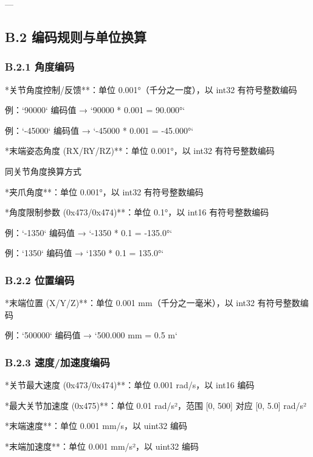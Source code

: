 \documentclass[UTF8,a4paper,11pt]{ctexart}
\begin{document}
{---

\subsection{B.2 编码规则与单位换算}

\subsubsection{B.2.1 角度编码}

\item **关节角度控制/反馈**：单位 0.001°（千分之一度），以 int32 有符号整数编码
\item 例：`90000` 编码值 → `90000 * 0.001 = 90.000°`
\item 例：`-45000` 编码值 → `-45000 * 0.001 = -45.000°`

\item **末端姿态角度 (RX/RY/RZ)**：单位 0.001°，以 int32 有符号整数编码
\item 同关节角度换算方式

\item **夹爪角度**：单位 0.001°，以 int32 有符号整数编码

\item **角度限制参数 (0x473/0x474)**：单位 0.1°，以 int16 有符号整数编码
\item 例：`-1350` 编码值 → `-1350 * 0.1 = -135.0°`
\item 例：`1350` 编码值 → `1350 * 0.1 = 135.0°`

\subsubsection{B.2.2 位置编码}

\item **末端位置 (X/Y/Z)**：单位 0.001 mm（千分之一毫米），以 int32 有符号整数编码
\item 例：`500000` 编码值 → `500.000 mm = 0.5 m`

\subsubsection{B.2.3 速度/加速度编码}

\item **关节最大速度 (0x473/0x474)**：单位 0.001 rad/s，以 int16 编码
\item **最大关节加速度 (0x475)**：单位 0.01 rad/s²，范围 [0, 500] 对应 [0, 5.0] rad/s²
\item **末端速度**：单位 0.001 mm/s，以 uint32 编码
\item **末端加速度**：单位 0.001 mm/s²，以 uint32 编码

}
\end{document}
